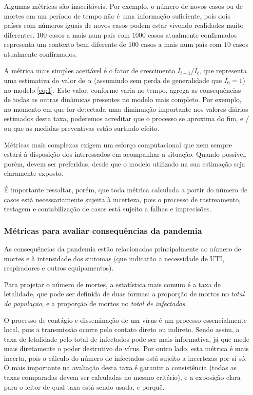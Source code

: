 \documentclass[12pt]{extarticle}
\begin{document}
Algumas métricas são inaceitáveis. Por exemplo, o número de novos casos ou de mortes em um período de tempo não é uma informação suficiente, pois dois países com números iguais de novos casos podem estar vivendo realidades muito diferentes. $100$ casos a mais num país com $1000$ casos atualmente confirmados representa um contexto bem diferente de $100$ casos a mais num país com $10$ casos atualmente confirmados.

A métrica mais simples aceitável é o fator de crescimento $I_{t+1} / I_t$, que representa uma estimativa do valor de $\alpha$ (assumindo sem perda de generalidade que $I_0 = 1$) no modelo \ref{eq:1}. Este valor, conforme varia no tempo, agrega as consequências de todas as outras dinâmicas presentes no modelo mais completo. Por exemplo, no momento em que for detectada uma diminuição importante nos valores diários estimados desta taxa, poderemos acreditar que o processo se aproxima do fim, e / ou que as medidas preventivas estão surtindo efeito.

Métricas mais complexas exigem um esforço computacional que nem sempre estará à disposição dos interessados em acompanhar a situação. Quando possível, porém, devem ser preferidas, desde que o modelo utilizado na sua estimação seja claramente exposto.

É importante ressaltar, porém, que toda métrica calculada a partir do número de casos está necessariamente sujeita à incerteza, pois o processo de rastreamento, testagem e contabilização de casos está sujeito a falhas e imprecisões.

\subsubsection{Métricas para avaliar consequências da pandemia}

As consequências da pandemia estão relacionadas principalmente ao número de mortes e à intensidade dos sintomas (que indicarão a necessidade de UTI, respiradores e outros equipamentos). 

Para projetar o número de mortes, a estatística mais comum é a taxa de letalidade, que pode ser definida de duas formas: a proporção de mortos no \textit{total da população}, e a proporção de mortos no \textit{total de infectados}.

O processo de contágio e disseminação de um vírus é um processo essencialmente local, pois a transmissão ocorre pelo contato direto ou indireto. Sendo assim, a taxa de letalidade pelo total de infectados pode ser mais informativa, já que mede mais diretamente o poder destrutivo do vírus. Por outro lado, esta métrica é mais incerta, pois o cálculo do número de infectados está sujeito a incertezas por si só. O mais importante na avaliação desta taxa é garantir a consistência (todas as taxas comparadas devem ser calculadas no mesmo critério), e a exposição clara para o leitor de qual taxa está sendo usada, e porquê.
\end{document}
